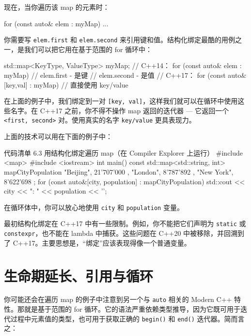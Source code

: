 现在，当你遍历该 map 的元素时：

\begin{codebox}[cpp]
for (const auto& elem : myMap) { ... }
\end{codebox}

你需要写 \texttt{elem.first} 和 \texttt{elem.second} 来引用键和值。结构化绑定最酷的用例之一，是我们可以把它用在基于范围的 for 循环中：

\begin{codebox}[cpp]
std::map<KeyType, ValueType> myMap;
// C++14：
for (const auto& elem : myMap) {
// elem.first - 是键
// elem.second - 是值
}
// C++17：
for (const auto& [key,val] : myMap) {
// 直接使用 key/value
}
\end{codebox}

在上面的例子中，我们绑定到一对 \texttt{[key, val]}，这样我们就可以在循环中使用这些名字。在 C++17 之前，你不得不操作 map 返回的迭代器 — 它返回一个 \texttt{<first, second>} 对。使用真实的名字 \texttt{key/value} 更具表现力。

上面的技术可以用在下面的例子中：

\begin{codeboxt}[cpp]{代码清单 6.3 用结构化绑定遍历 map（在 Compiler Explorer 上运行）}
#include <map>
#include <iostream>
int main() {
const std::map<std::string, int> mapCityPopulation {
{ "Beijing", 21'707'000 },
{ "London", 8'787'892 },
{ "New York", 8'622'698 }
};
for (const auto&[city, population] : mapCityPopulation)
std::cout << city << ": " << population << '\n';
}
\end{codeboxt}

在循环体中，你可以放心地使用 \texttt{city} 和 \texttt{population} 变量。

\begin{myInfoBox}
最初结构化绑定在 C++17 中有一些限制。例如，你不能把它们声明为 \texttt{static} 或 \texttt{constexpr}，也不能在 lambda 中捕获。这些问题在 C++20 中被移除，并回溯到了 C++17。主要思想是，“绑定”应该表现得像一个普通变量。
\end{myInfoBox}


\section{生命期延长、引用与循环}

你可能还会在遍历 map 的例子中注意到另一个与 \texttt{auto} 相关的 Modern C++ 特性。那就是基于范围的 for 循环。它的语法严重依赖类型推导，因为它既可用于迭代过程中元素值的类型，也可用于获取正确的 \texttt{begin()} 和 \texttt{end()} 迭代器。简而言之：

